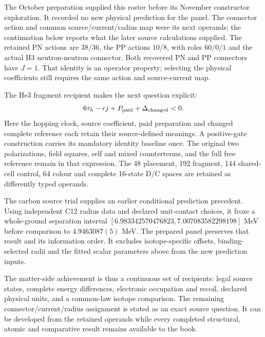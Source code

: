 The October preparation supplied this roster before its November constructor exploration. It recorded no new physical prediction for the panel. The connector action and common source/current/radius map were its next operands; the continuation below reports what the later source calculations supplied. The retained PN actions are $38/36$, the PP actions $10/8$, with roles $60/0/1$ and the actual H3 neutron-neutron connector. Both recovered PN and PP connectors have $J=1$. That identity is an operator property; selecting the physical coefficients still requires the same action and source-current map.

The He3 fragment recipient makes the next question explicit:
\begin{equation}
6\tau_h-\epsilon j+P_{\rm paid}+\Delta_{\rm changed}<0.
\end{equation}
Here the hopping clock, source coefficient, paid preparation and changed complete reference each retain their source-defined meanings. A positive-gate construction carries its mandatory identity baseline once. The original two polarizations, field squares, self and mixed counterterms, and the full free reference remain in that expression. The 48 placement, 192 fragment, 144 shared-cell control, 64 colour and complete 16-state D/C spaces are retained as differently typed operands.

The carbon source trial supplies an earlier conditional prediction precedent. Using independent C12 radius data and declared unit-contact choices, it froze a whole-ground separation interval $[6.983342570476823,7.007083582298198]$ MeV before comparison to $4.9463087(5)$ MeV. The prepared panel preserves that result and its information order. It excludes isotope-specific offsets, binding-selected radii and the fitted scalar parameters above from the new prediction inputs.

The matter-side achievement is thus a continuous set of recipients: legal source states, complete energy differences, electronic occupation and recoil, declared physical units, and a common-law isotope comparison. The remaining connector/current/radius assignment is stated as an exact source question. It can be developed from the retained operands while every completed structural, atomic and comparative result remains available to the book.


